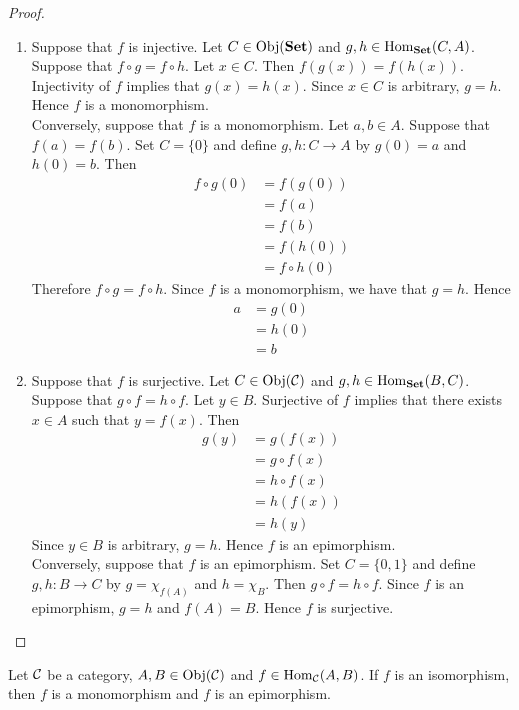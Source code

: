 \documentclass{book}
\begin{document}
	\begin{proof}\
		\begin{enumerate}
			\item Suppose that $f$ is injective. Let $C \in \operatorname{Obj}(\operatorname*{\text{\textbf{Set}}})$ and $g,h \in \operatorname{Hom}_{\operatorname*{\text{\textbf{Set}}}}(C, A)$. Suppose that $f \circ g = f \circ h$. Let $x \in C$. Then $f(g(x)) = f(h(x))$. Injectivity of $f$ implies that $g(x) = h(x)$. Since $x \in C$ is arbitrary, $g = h$. Hence $f$ is a monomorphism. \\
			Conversely, suppose that $f$ is a monomorphism. Let $a, b \in A$. Suppose that $f(a) = f(b)$. Set $C = \{0\}$ and define $g,h: C \rightarrow A$ by $g(0) = a$ and $h(0) = b$. Then  
			\begin{align*}
				f \circ g(0) 
				& = f(g(0)) \\
				& = f(a) \\
				& = f(b) \\
				& = f(h(0)) \\
				& = f \circ h(0) 
			\end{align*}
			Therefore $f \circ g = f \circ h$. Since $f$ is a monomorphism, we have that $g = h$. Hence 
			\begin{align*}
				a 
				& = g(0) \\
				& = h(0) \\
				& = b
			\end{align*}
			\item Suppose that $f$ is surjective. Let $C \in \operatorname{Obj}(\mathcal{C})$ and $g,h \in \operatorname{Hom}_{\operatorname*{\text{\textbf{Set}}}}(B, C)$. Suppose that $g \circ f = h \circ f$. Let $y \in B$. Surjective of $f$ implies that there exists $x \in A$ such that $y = f(x)$. 
			Then 
			\begin{align*}
				g(y)
				& = g(f(x)) \\
				& = g \circ f (x) \\
				& = h \circ f (x) \\
				& = h(f(x)) \\
				& = h(y) 
			\end{align*}
			Since $y \in B$ is arbitrary, $g = h$. Hence $f$ is an epimorphism. \\
			Conversely, suppose that $f$ is an epimorphism. Set $C = \{0,1\}$ and define $g, h: B \rightarrow C$ by $g = \chi_{f(A)}$ and $h = \chi_{B}$. Then $g \circ f = h \circ f$. Since $f$ is an epimorphism, $g = h$ and $f(A) = B$. Hence $f$ is surjective.  
		\end{enumerate}
	\end{proof}
	
	\begin{ex} 
		Let $\mathcal{C}$ be a category, $A,B \in \operatorname{Obj}(\mathcal{C})$ and $f \in \operatorname{Hom}_{\mathcal{C}}(A, B)$. If $f$ is an isomorphism, then $f$ is a monomorphism and $f$ is an epimorphism. 
	\end{ex}
	
\end{document}

